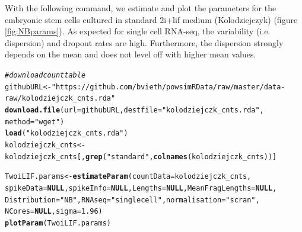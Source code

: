 \documentclass{article}\usepackage[]{graphicx}\usepackage[usenames,dvipsnames]{color}
\makeatletter
\newcommand{\hlnum}[1]{\textcolor[rgb]{0.686,0.059,0.569}{#1}}%
\newcommand{\hlstr}[1]{\textcolor[rgb]{0.192,0.494,0.8}{#1}}%
\newcommand{\hlcom}[1]{\textcolor[rgb]{0.678,0.584,0.686}{\textit{#1}}}%
\newcommand{\hlstd}[1]{\textcolor[rgb]{0.345,0.345,0.345}{#1}}%
\newcommand{\hlkwa}[1]{\textcolor[rgb]{0.161,0.373,0.58}{\textbf{#1}}}%
\newcommand{\hlkwb}[1]{\textcolor[rgb]{0.69,0.353,0.396}{#1}}%
\newcommand{\hlkwc}[1]{\textcolor[rgb]{0.333,0.667,0.333}{#1}}%
\newcommand{\hlkwd}[1]{\textcolor[rgb]{0.737,0.353,0.396}{\textbf{#1}}}%
\newenvironment{kframe}{%
 \def\at@end@of@kframe{}%
 \ifinner\ifhmode%
  \def\at@end@of@kframe{\end{minipage}}%
  \begin{minipage}{\columnwidth}%
 \fi\fi%
 \def\FrameCommand##1{\hskip\@totalleftmargin \hskip-\fboxsep
 \colorbox{shadecolor}{##1}\hskip-\fboxsep
     \hskip-\linewidth \hskip-\@totalleftmargin \hskip\columnwidth}%
 \MakeFramed {\advance\hsize-\width
   \@totalleftmargin\z@ \linewidth\hsize
   \@setminipage}}%
 {\par\unskip\endMakeFramed%
 \at@end@of@kframe}
\newenvironment{knitrout}{}{} %
\makeatother
\begin{document}
With the following command, we estimate and plot the parameters for the embryonic stem cells cultured in standard 2i+lif medium (Kolodziejczyk) (figure \ref{fig:NBparams}). As expected for single cell RNA-seq, the variability (i.e. dispersion) and dropout rates are high. Furthermore, the dispersion strongly depends on the mean and does not level off with higher mean values.

\begin{knitrout}
\color{fgcolor}\begin{kframe}
\begin{alltt}
\hlcom{# download count table}
\hlstd{githubURL} \hlkwb{<-} \hlstr{"https://github.com/bvieth/powsimRData/raw/master/data-raw/kolodziejczk_cnts.rda"}
\hlkwd{download.file}\hlstd{(}\hlkwc{url} \hlstd{= githubURL,} \hlkwc{destfile} \hlstd{=} \hlstr{"kolodziejczk_cnts.rda"}\hlstd{,}
    \hlkwc{method} \hlstd{=} \hlstr{"wget"}\hlstd{)}
\hlkwd{load}\hlstd{(}\hlstr{"kolodziejczk_cnts.rda"}\hlstd{)}
\hlstd{kolodziejczk_cnts} \hlkwb{<-} \hlstd{kolodziejczk_cnts[,} \hlkwd{grep}\hlstd{(}\hlstr{"standard"}\hlstd{,} \hlkwd{colnames}\hlstd{(kolodziejczk_cnts))]}

\hlstd{TwoiLIF.params} \hlkwb{<-} \hlkwd{estimateParam}\hlstd{(}\hlkwc{countData} \hlstd{= kolodziejczk_cnts,}
    \hlkwc{spikeData} \hlstd{=} \hlkwa{NULL}\hlstd{,} \hlkwc{spikeInfo} \hlstd{=} \hlkwa{NULL}\hlstd{,} \hlkwc{Lengths} \hlstd{=} \hlkwa{NULL}\hlstd{,} \hlkwc{MeanFragLengths} \hlstd{=} \hlkwa{NULL}\hlstd{,}
    \hlkwc{Distribution} \hlstd{=} \hlstr{"NB"}\hlstd{,} \hlkwc{RNAseq} \hlstd{=} \hlstr{"singlecell"}\hlstd{,} \hlkwc{normalisation} \hlstd{=} \hlstr{"scran"}\hlstd{,}
    \hlkwc{NCores} \hlstd{=} \hlkwa{NULL}\hlstd{,} \hlkwc{sigma} \hlstd{=} \hlnum{1.96}\hlstd{)}
\hlkwd{plotParam}\hlstd{(TwoiLIF.params)}
\end{alltt}
\end{kframe}
\end{knitrout}
\end{document}
